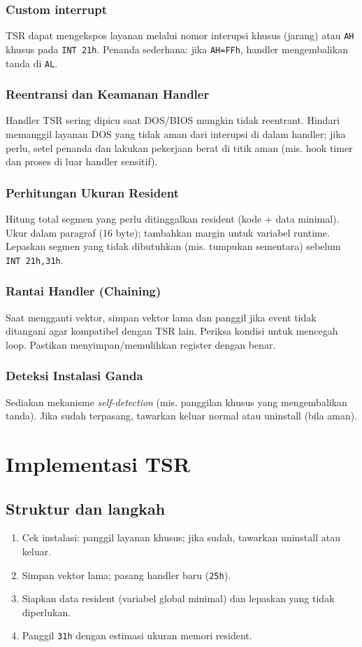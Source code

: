 \subsubsection{Custom interrupt}
TSR dapat mengekspos layanan melalui nomor interupsi khusus (jarang) atau \texttt{AH} khusus pada \texttt{INT 21h}. Penanda sederhana: jika \texttt{AH=FFh}, handler mengembalikan tanda di \texttt{AL}.

\subsubsection{Reentransi dan Keamanan Handler}
Handler TSR sering dipicu saat DOS/BIOS mungkin tidak reentrant. Hindari memanggil layanan DOS yang tidak aman dari interupsi di dalam handler; jika perlu, setel penanda dan lakukan pekerjaan berat di titik aman (mis. hook timer dan proses di luar handler sensitif). 
\subsubsection{Perhitungan Ukuran Resident}
Hitung total segmen yang perlu ditinggalkan resident (kode + data minimal). Ukur dalam paragraf (16 byte); tambahkan margin untuk variabel runtime. Lepaskan segmen yang tidak dibutuhkan (mis. tumpukan sementara) sebelum \texttt{INT 21h,31h}. 
\subsubsection{Rantai Handler (Chaining)}
Saat mengganti vektor, simpan vektor lama dan panggil jika event tidak ditangani agar kompatibel dengan TSR lain. Periksa kondisi untuk mencegah loop. Pastikan menyimpan/memulihkan register dengan benar. 
\subsubsection{Deteksi Instalasi Ganda}
Sediakan mekanisme \textit{self-detection} (mis. panggilan khusus yang mengembalikan tanda). Jika sudah terpasang, tawarkan keluar normal atau uninstall (bila aman). 
\section{Implementasi TSR}
\subsection{Struktur dan langkah}
\begin{enumerate}
  \item Cek instalasi: panggil layanan khusus; jika sudah, tawarkan uninstall atau keluar.
  \item Simpan vektor lama; pasang handler baru (\texttt{25h}).
  \item Siapkan data resident (variabel global minimal) dan lepaskan yang tidak diperlukan.
  \item Panggil \texttt{31h} dengan estimasi ukuran memori resident.
\end{enumerate}

